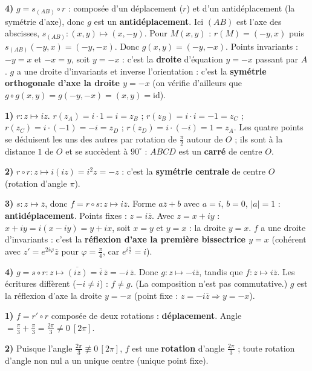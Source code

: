 \textbf{4)} $g=s_{(AB)}\circ r$ : composée d'un déplacement ($r$) et d'un antidéplacement (la symétrie d'axe), donc $g$ est un \textbf{antidéplacement}. Ici $(AB)$ est l'axe des abscisses, $s_{(AB)}:(x,y)\mapsto(x,-y)$. Pour $M(x,y)$ : $r(M)=(-y,x)$ puis $s_{(AB)}(-y,x)=(-y,-x)$. Donc $g(x,y)=(-y,-x)$. Points invariants : $-y=x$ et $-x=y$, soit $y=-x$ : c'est la \textbf{droite} d'équation $y=-x$ passant par $A$. $g$ a une droite d'invariants et inverse l'orientation : c'est la \textbf{symétrie orthogonale d'axe la droite $y=-x$} (on vérifie d'ailleurs que $g\circ g(x,y)=g(-y,-x)=(x,y)=\mathrm{id}$).

\textbf{1)} $r:z\mapsto iz$. $r(z_A)=i\cdot1=i=z_B$ ; $r(z_B)=i\cdot i=-1=z_C$ ; $r(z_C)=i\cdot(-1)=-i=z_D$ ; $r(z_D)=i\cdot(-i)=1=z_A$. Les quatre points se déduisent les uns des autres par rotation de $\frac\pi2$ autour de $O$ ; ils sont à la distance $1$ de $O$ et se succèdent à $90^\circ$ : $ABCD$ est un \textbf{carré} de centre $O$.

\textbf{2)} $r\circ r:z\mapsto i(iz)=i^2 z=-z$ : c'est la \textbf{symétrie centrale} de centre $O$ (rotation d'angle $\pi$).

\textbf{3)} $s:z\mapsto\overline z$, donc $f=r\circ s:z\mapsto i\overline z$. Forme $a\overline z+b$ avec $a=i$, $b=0$, $|a|=1$ : \textbf{antidéplacement}. Points fixes : $z=i\overline z$. Avec $z=x+iy$ : $x+iy=i(x-iy)=y+ix$, soit $x=y$ et $y=x$ : la droite $y=x$. $f$ a une droite d'invariants : c'est la \textbf{réflexion d'axe la première bissectrice $y=x$} (cohérent avec $z'=e^{2i\varphi}\overline z$ pour $\varphi=\frac\pi4$, car $e^{i\frac\pi2}=i$).

\textbf{4)} $g=s\circ r:z\mapsto\overline{(iz)}=\overline i\,\overline z=-i\,\overline z$. Donc $g:z\mapsto-i\overline z$, tandis que $f:z\mapsto i\overline z$. Les écritures diffèrent ($-i\neq i$) : $f\neq g$. (La composition n'est pas commutative.) $g$ est la réflexion d'axe la droite $y=-x$ (point fixe : $z=-i\overline z\Rightarrow y=-x$).

\textbf{1)} $f=r'\circ r$ composée de deux rotations : \textbf{déplacement}. Angle $=\frac\pi3+\frac\pi3=\frac{2\pi}3\neq0\ [2\pi]$.

\textbf{2)} Puisque l'angle $\frac{2\pi}3\not\equiv0\,[2\pi]$, $f$ est une \textbf{rotation} d'angle $\frac{2\pi}3$ ; toute rotation d'angle non nul a un unique centre (unique point fixe).

